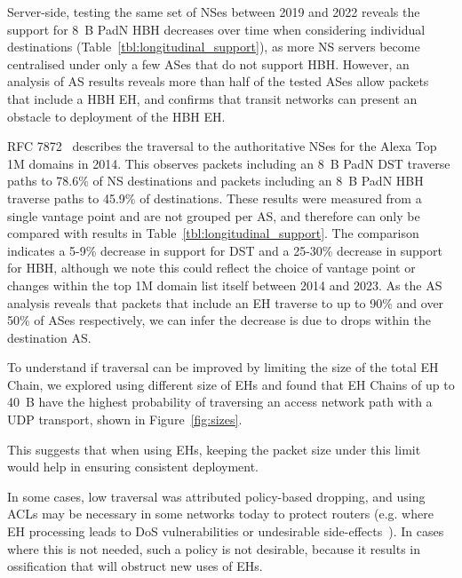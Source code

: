 \documentclass[conference]{IEEEtran}
\begin{document}
Server-side, testing the same set of NSes between 2019 and 2022 reveals the support for 8~B PadN HBH decreases over time when considering individual destinations (Table~\ref{tbl:longitudinal_support}), as more NS servers become centralised under only a few ASes that do not support HBH.  However, an analysis of AS results reveals more than half of the tested ASes allow packets that include a HBH EH, and confirms that transit networks can present an obstacle to deployment of the HBH EH.

RFC 7872~\cite{RFC7872} describes the traversal to the authoritative NSes for the Alexa Top 1M domains in 2014. This observes packets including an 8~B PadN DST traverse paths to 78.6\% of NS destinations and packets including an 8~B PadN HBH traverse paths to 45.9\% of destinations. These results were measured from a single vantage point and are not grouped per AS, and therefore can only be compared with results in Table~\ref{tbl:longitudinal_support}. The comparison indicates a 5-9\% decrease in support for DST and a 25-30\% decrease in support for HBH, although we note this could reflect the choice of vantage point or changes within the top 1M domain list itself between 2014 and 2023.
As the AS analysis reveals that packets that include an EH traverse to up to 90\% and over 50\% of ASes respectively, we can infer the decrease is due to drops within the destination AS.



To understand if traversal can be improved by limiting the size of the total EH Chain, we explored using different size of EHs and found that EH Chains of up to 40~B have the highest probability of traversing an access network path with a UDP transport, shown in Figure~\ref{fig:sizes}.

This suggests that when using EHs, keeping the packet size under this limit would help in ensuring consistent deployment.

In some cases, low traversal was attributed policy-based dropping, and using ACLs may be necessary in some networks today to protect routers (e.g. where EH processing leads to DoS vulnerabilities or undesirable side-effects~\cite{passive-threats}). In cases where this is not needed, such a policy is not desirable, because it results in ossification that will obstruct new uses of EHs.
\end{document}
